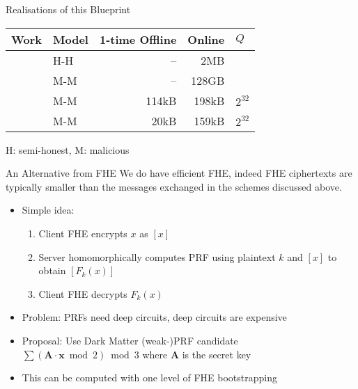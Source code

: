 \documentclass[xcolor=table,10pt,aspectratio=169]{beamer}
\renewcommand{\vec}[1]{\ensuremath{\mathbf{#1}}\xspace}
\providecommand{\mat}[1]{\ensuremath{\vec{#1}}\xspace}
\begin{document}
\begin{frame}[label={sec:org07ae4d3}]{Realisations of this Blueprint}
\begin{center}
\begin{tabular}{llrrl}
\toprule
Work & Model & 1-time Offline & Online & \(Q\)\\
\midrule
\cite{PKC:ADDS21} & H-H & -- & 2MB & \\
\cite{PKC:ADDS21} & M-M & -- & 128GB & \\
\cite{AC:AlbGur24} & M-M & 114kB & 198kB & \(2^{32}\)\\
\cite{EPRINT:ESTX24} & M-M & 20kB & 159kB & \(2^{32}\)\\
\bottomrule
\end{tabular}

\end{center}

\begin{center}
H: semi-honest, M: malicious
\end{center}
\end{frame}
\begin{frame}[label={sec:orgafbbdfd}]{An Alternative from FHE \cite{EC:ADDG24}}
We do have efficient FHE, indeed FHE ciphertexts are typically \alert{smaller} than the messages exchanged in the schemes discussed above.
\begin{itemize}
\item Simple idea:
\begin{enumerate}
\item Client FHE encrypts \(x\) as \([x]\)
\item Server homomorphically computes PRF using plaintext \(k\) and \([x]\) to obtain \([F_{k}(x)]\)
\item Client FHE decrypts \(F_{k}(x)\)
\end{enumerate}
\item Problem: PRFs need deep circuits, deep circuits are expensive
\item Proposal: Use Dark Matter (weak-)PRF candidate \cite{TCC:BIPSW18} \(\sum \left(\mat{A}\cdot \vec{x} \bmod 2\right) \bmod 3\) where \(\mat{A}\) is the secret key
\item This can be computed with one level of FHE bootstrapping
\end{itemize}
\end{frame}
\end{document}
